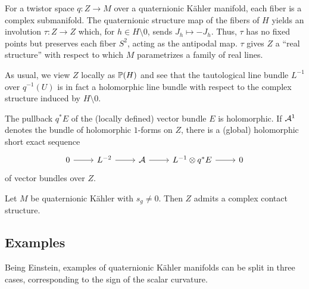 \documentclass{scrartcl}
\begin{document}
For a twistor space $q:Z\to M$ over a quaternionic K\"ahler manifold, each fiber is a complex submanifold. The quaternionic structure map of the fibers of $H$ yields an involution $\tau:Z\to Z$ which, for $h\in H\setminus 0$, sends $J_h\mapsto -J_h$. Thus, $\tau$ has no fixed points but preserves each fiber $S^2$, acting as the antipodal map. $\tau$ gives $Z$ a ``real structure'' with respect to which $M$ parametrizes a family of real lines.

\medskip

As usual, we view $Z$ locally as $\P(H)$ and see that the tautological line bundle $L^{-1}$ over $q^{-1}(U)$ is in fact a holomorphic line bundle with respect to the complex structure induced by $H\setminus 0$.

\begin{thm}
	The pullback $q^*E$ of the (locally defined) vector bundle $E$ is holomorphic. If $\mc A^1$ denotes the bundle of holomorphic $1$-forms on $Z$, there is a (global) holomorphic short exact sequence
	\begin{equation}\label{eq:pullbackSES}
		\begin{tikzcd}
			0 \ar[r] & L^{-2} \ar[r] & \mc A \ar[r] & L^{-1}\otimes q^*E \ar[r] & 0
		\end{tikzcd}
	\end{equation}
	of vector bundles over $Z$.
\end{thm}
\begin{myproof}
\end{myproof}

\begin{thm}
	Let $M$ be quaternionic K\"ahler with $s_g\neq 0$. Then $Z$ admits a complex contact structure.
\end{thm}
\begin{myproof}
\end{myproof}

\subsection{Examples}

Being Einstein, examples of quaternionic K\"ahler manifolds can be split in three cases, corresponding to the sign of the scalar curvature.

\medskip
\end{document}
